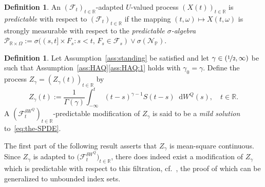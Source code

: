 \documentclass[reqno]{amsart}
\numberwithin{equation}{section}
\newcommand{\bbP}{\mathbb{P}}
\newcommand{\bbR}{\mathbb{R}}
\newcommand{\R}{\mathbb{R}}
\newcommand{\cF}{\mathcal{F}}
\newcommand{\cN}{\mathcal{N}}
\newcommand{\cP}{\mathcal{P}}
\newcommand{\rd}{\mathop{}\!\mathrm{d}}
\theoremstyle{remark}
\theoremstyle{definition}
\newtheorem{definition}[lemma]{Definition}
\begin{document}
\begin{definition}\label{def:predictable}
	An $(\cF_t)_{t\in\bbR}$-adapted $U$-valued process $(X(t))_{t\in\bbR}$ is \emph{predictable}
	with respect to $(\cF_t)_{t\in\bbR}$
	if the mapping $(t, \omega) \mapsto X(t,\omega)$
	is strongly measurable with respect to the \emph{predictable $\sigma$-algebra}
	$
	\cP_{\bbR \times \Omega} := \sigma((s, t] \times F_s : s < t, \, F_s \in \cF_s) \vee \sigma(\cN_\bbP).
	$
\end{definition}

\begin{definition}\label{def:mildsol}
	Let Assumption~\ref{ass:standing} be satisfied and
	let $\gamma \in (\nicefrac{1}{2}, \infty)$ be such that 
	Assumption~\ref{ass:HAQ}\ref{ass:HAQ:1} holds with $\gamma_0 = \gamma$.
	Define the process
	$Z_\gamma = (Z_\gamma(t))_{t\in\bbR}$ by
	\begin{equation}\label{eq:def-minusinfty-Zgamma}
		Z_\gamma(t) := \frac{1}{\Gamma(\gamma)}\int_{-\infty}^t (t-s)^{\gamma-1} S(t-s) \rd W^Q(s), \quad t \in \bbR.
	\end{equation}
	A $(\cF_t^{\delta W^Q})_{t\in \R}$-predictable modification of $Z_\gamma$ is said to be a \emph{mild solution}
	to~\eqref{eq:the-SPDE}.
\end{definition}
%
The first part of the following result 
asserts that $Z_\gamma$ is mean-square continuous.
Since $Z_\gamma$ is adapted to $\bigl(\cF_t^{\delta W^Q}\bigr)_{t\in\bbR}$,
there does indeed exist a modification of $Z_\gamma$ which is predictable with respect
to this filtration, cf.\ \cite[Proposition~3.7(ii)]{DaPrato2014}, the proof of which
can be generalized to unbounded index sets.
\end{document}
